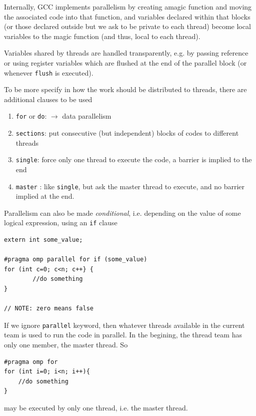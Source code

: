 \begin{mdframed}
Internally, GCC implements parallelism by creating amagic function and moving
the associated code into that function, and variables declared within that
blocks (or those declared outside but we ask to be private to each thread)
become local variables to the magic function (and thus, local to each thread).

Variables shared by threads are handled transparently, e.g. by passing reference
or using register variables which are flushed at the end of the parallel block
(or whenever \verb!flush! is executed).
\end{mdframed}

To be more specify in how the work should be distributed to threads, there are
additional clauses to be used
\begin{enumerate}
  \item \verb!for! or \verb!do!: $\rightarrow$ data parallelism 
  \item \verb!sections!: put consecutive (but independent) blocks of codes to
  different threads 
  \item \verb!single!: force only one thread to execute the code, a barrier is
  implied to the end
  \item \verb!master! : like \verb!single!, but ask the master thread to
  execute, and no barrier implied at the end.
\end{enumerate}

Parallelism can also be made {\it conditional}, i.e. depending on the value of
some logical expression, using  an \verb!if! clause
\begin{verbatim}
extern int some_value;

#pragma omp parallel for if (some_value)
for (int c=0; c<n; c++} {
		//do something
}

// NOTE: zero means false
\end{verbatim}

If we ignore \verb!parallel! keyword, then whatever threads available in the
current team is used to run the code in parallel. In the begining, the thread
team has only one member, the master thread. So
\begin{lstlisting}
#pragma omp for 
for (int i=0; i<n; i++){
	//do something
}
\end{lstlisting}
may be executed by only one thread, i.e. the master thread.

